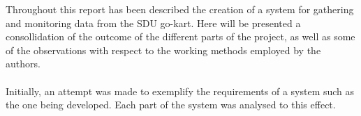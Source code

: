 Throughout this report has been described the creation of a system for gathering and monitoring data from the SDU go-kart.
Here will be presented a consollidation of the outcome of the different parts of the project, as well as some of the observations with respect to the working methods employed by the authors.
\\~\\
Initially, an attempt was made to exemplify the requirements of a system such as the one being developed.
Each part of the system was analysed to this effect.